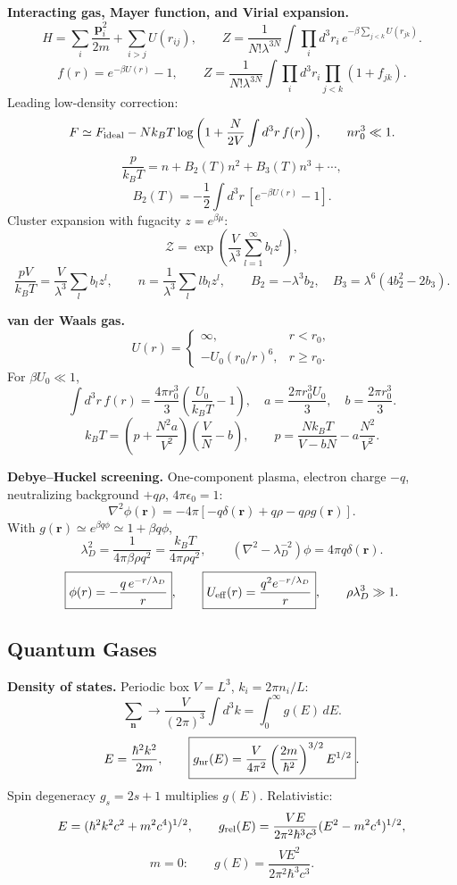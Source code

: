 \noindent\textbf{Interacting gas, Mayer function, and Virial expansion.}\quad
\[
H=\sum_i\frac{\mathbf p_i^2}{2m}+\sum_{i>j}U(r_{ij}),
\qquad
Z=\frac{1}{N!\lambda^{3N}}\int\prod_i d^3r_i\,
e^{-\beta\sum_{j<k}U(r_{jk})}.
\]
\[
\boxed{f(r)=e^{-\beta U(r)}-1},
\qquad
Z=\frac{1}{N!\lambda^{3N}}\int\prod_i d^3r_i\prod_{j<k}(1+f_{jk}).
\]
Leading low-density correction:
\[
F\simeq F_{\rm ideal}
-Nk_BT\log\left(1+\frac{N}{2V}\int d^3r\,f(r)\right),
\qquad nr_0^3\ll1.
\]
\[
\boxed{\frac{p}{k_BT}=n+B_2(T)n^2+B_3(T)n^3+\cdots},
\]
\[
\boxed{B_2(T)=-\frac12\int d^3r\,[e^{-\beta U(r)}-1]}.
\]
Cluster expansion with fugacity $z=e^{\beta\mu}$:
\[
\boxed{\mathcal Z=\exp\left(\frac{V}{\lambda^3}
\sum_{l=1}^\infty b_lz^l\right)},
\]
\[
\frac{pV}{k_BT}=\frac{V}{\lambda^3}\sum_l b_lz^l,
\qquad
n=\frac{1}{\lambda^3}\sum_l lb_lz^l,
\qquad
B_2=-\lambda^3b_2,\quad B_3=\lambda^6(4b_2^2-2b_3).
\]

\noindent\textbf{van der Waals gas.}\quad
\[
U(r)=
\begin{cases}
\infty,&r<r_0,\\
-U_0(r_0/r)^6,&r\ge r_0.
\end{cases}
\]
For $\beta U_0\ll1$,
\[
\int d^3r\,f(r)=\frac{4\pi r_0^3}{3}
\left(\frac{U_0}{k_BT}-1\right),
\quad
a=\frac{2\pi r_0^3U_0}{3},\quad b=\frac{2\pi r_0^3}{3}.
\]
\[
\boxed{k_BT=\left(p+\frac{N^2a}{V^2}\right)
\left(\frac{V}{N}-b\right)},
\qquad
\boxed{p=\frac{Nk_BT}{V-bN}-a\frac{N^2}{V^2}}.
\]

\noindent\textbf{Debye--Huckel screening.}\quad
One-component plasma, electron charge $-q$, neutralizing background $+q\rho$,
$4\pi\epsilon_0=1$:
\[
\nabla^2\phi(\mathbf r)
=-4\pi[-q\delta(\mathbf r)+q\rho-q\rho g(\mathbf r)].
\]
With $g(\mathbf r)\simeq e^{\beta q\phi}\simeq1+\beta q\phi$,
\[
\lambda_D^2=\frac{1}{4\pi\beta\rho q^2}
=\frac{k_BT}{4\pi\rho q^2},
\qquad
\left(\nabla^2-\lambda_D^{-2}\right)\phi=4\pi q\delta(\mathbf r).
\]
\[
\boxed{\phi(r)=-\frac{q\,e^{-r/\lambda_D}}{r}},
\qquad
\boxed{U_{\rm eff}(r)=\frac{q^2e^{-r/\lambda_D}}{r}},
\qquad
\rho\lambda_D^3\gg1.
\]

\subsection{Quantum Gases}

\noindent\textbf{Density of states.}\quad
Periodic box $V=L^3$, $k_i=2\pi n_i/L$:
\[
\sum_{\mathbf n}\to\frac{V}{(2\pi)^3}\int d^3k
=\int_0^\infty g(E)\,dE.
\]
\[
E=\frac{\hbar^2k^2}{2m},
\qquad
\boxed{g_{\rm nr}(E)=\frac{V}{4\pi^2}
\left(\frac{2m}{\hbar^2}\right)^{3/2}E^{1/2}}.
\]
Spin degeneracy $g_s=2s+1$ multiplies $g(E)$. Relativistic:
\[
E=(\hbar^2k^2c^2+m^2c^4)^{1/2},
\qquad
g_{\rm rel}(E)=\frac{VE}{2\pi^2\hbar^3c^3}(E^2-m^2c^4)^{1/2},
\]
\[
m=0:\qquad g(E)=\frac{VE^2}{2\pi^2\hbar^3c^3}.
\]

